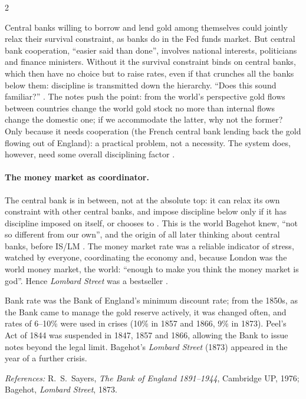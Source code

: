 \begin{paracol}{2}
\begin{intuition}
Central banks willing to borrow and lend gold among themselves could jointly relax their survival constraint, as banks do in the Fed funds market. But central bank cooperation, ``easier
said than done'', involves national interests, politicians and finance ministers. Without it the survival constraint binds on central banks, which then have no choice but to raise rates,
even if that crunches all the banks below them: discipline is transmitted down the hierarchy. ``Does this sound familiar?'' . The notes push the point: from the world's perspective gold flows between countries change the world gold stock no
more than internal flows change the domestic one; if we accommodate the latter, why not the former? Only because it needs cooperation (the French central bank lending back the gold flowing out
of England): a practical problem, not a necessity. The system does, however, need some overall disciplining factor .
\end{intuition}

\paragraph{The money market as coordinator.} The central bank is in between, not at the absolute top: it can relax its own constraint with other central banks, and impose discipline below
only if it has discipline imposed on itself, or chooses to . This is the world Bagehot knew, ``not so different from our own'', and the origin of all later thinking about central
banks, before IS/LM . The money market rate was a reliable indicator of stress, watched by everyone, coordinating the economy and, because London was the world money
market, the world: ``enough to make you think the money market is god''. Hence \emph{Lombard Street} was a bestseller .

\begin{history}
Bank rate was the Bank of England's minimum discount rate; from the 1850s, as the Bank came to manage the gold reserve actively, it was changed often, and rates of 6--10\% were used in crises
(10\% in 1857 and 1866, 9\% in 1873). Peel's Act of 1844 was suspended in 1847, 1857 and 1866, allowing the Bank to issue notes beyond the legal limit. Bagehot's \emph{Lombard Street} (1873) appeared
in the year of a further crisis.\par
\emph{References:} R.~S.~Sayers, \emph{The Bank of England 1891--1944}, Cambridge UP, 1976; Bagehot, \emph{Lombard Street}, 1873.
\end{history}


\end{paracol}
